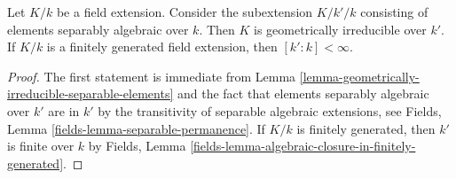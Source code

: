 \begin{lemma}
\label{lemma-make-geometrically-irreducible}
Let $K/k$ be a field extension. Consider the subextension $K/k'/k$ consisting
of elements separably algebraic over $k$. Then $K$ is geometrically irreducible
over $k'$. If $K/k$ is a finitely generated field extension, then
$[k' : k] < \infty$.
\end{lemma}

\begin{proof}
The first statement is immediate from
Lemma \ref{lemma-geometrically-irreducible-separable-elements}
and the fact that elements separably algebraic over $k'$
are in $k'$ by the transitivity of separable algebraic
extensions, see Fields, Lemma \ref{fields-lemma-separable-permanence}.
If $K/k$ is finitely generated, then $k'$ is finite over $k$ by
Fields, Lemma \ref{fields-lemma-algebraic-closure-in-finitely-generated}.
\end{proof}
